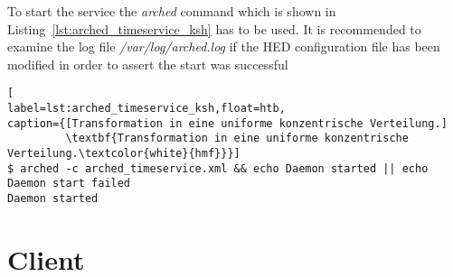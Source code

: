 To start the service the \textit{arched} command which is shown in Listing~\ref{lst:arched_timeservice_ksh} has to be used.
It is recommended to examine the log file \textit{/var/log/arched.log} if the HED configuration file has been modified in order to  assert the start was successful
\begin{lstlisting}[
label=lst:arched_timeservice_ksh,float=htb,
caption={[Transformation in eine uniforme konzentrische Verteilung.]
         \textbf{Transformation in eine uniforme konzentrische Verteilung.\textcolor{white}{hmf}}}]
$ arched -c arched_timeservice.xml && echo Daemon started || echo Daemon start failed
Daemon started
\end{lstlisting}



\section{Client}

